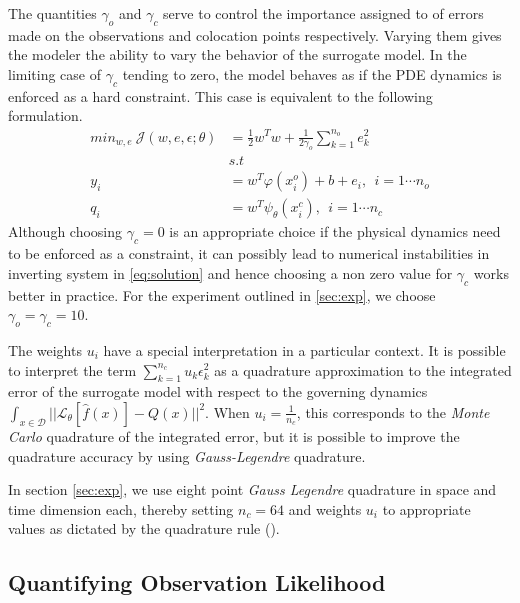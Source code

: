 The quantities $\gamma_o$ and $\gamma_c$ serve to control the importance assigned to
of errors made on the observations and colocation points respectively. Varying them 
gives the modeler the ability to vary the behavior of the surrogate model. In the 
limiting case of $\gamma_c$ tending to zero, the model behaves as if the PDE dynamics
is enforced as a hard constraint. This case is equivalent to the following formulation.
%
\begin{align}\label{eq:surrogate2}
   min_{w,e} \ \mathcal{J}(w,e,\epsilon;\theta) &= 
   \frac{1}{2} w^{T}w + \frac{1}{2\gamma_{o}} \sum_{k = 1}^{n_{o}}{e^{2}_{k}} \\
  & s.t \nonumber \\
  y_{i} & = w^{T}\varphi(x^{o}_{i}) + b + e_{i}, \ \ i = 1 \cdots n_{o} \\
  q_{i} & = w^{T}\psi_{\theta}(x^{c}_{i}), \ \ i = 1 \cdots n_{c}
\end{align}
%
Although choosing $\gamma_c = 0$ is an appropriate choice if the physical dynamics need to be 
enforced as a constraint, it can possibly lead to numerical
instabilities in inverting system in \cref{eq:solution} and hence choosing a non zero value 
for $\gamma_c$ works better in practice. For the experiment outlined in \ref{sec:exp}, 
we choose $\gamma_o = \gamma_c = 10$.

The weights $u_i$ have a special interpretation in a particular context. It is possible to
interpret the term $\sum_{k = 1}^{n_{c}}{u_{k} \epsilon^{2}_{k}}$ as a quadrature approximation
to the integrated error of the surrogate model with respect to the governing dynamics $\int_{x \in \mathcal{D}}{||\mathcal{L}_{\theta} [\hat{f}(x)] - Q(x)||^2}$. When
$u_i = \frac{1}{n_c}$, this corresponds to the \emph{Monte Carlo} quadrature of 
the integrated error, but it is possible to improve the quadrature accuracy by using \emph{Gauss-Legendre} quadrature.

In section \ref{sec:exp}, we use eight point \emph{Gauss Legendre} quadrature in space and time dimension each, thereby setting $n_c = 64$ and weights $u_i$ to appropriate values as dictated by the quadrature rule (\citet{_abramowitzm}).

\subsection{Quantifying Observation Likelihood}

